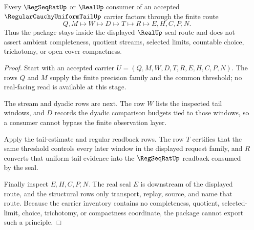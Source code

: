 \begin{theorem}
\label{thm:regular-cauchy-uniform-tail-real-seal-nonescape}
Every $\RegSeqRatUp$ or $\RealUp$ consumer of an accepted $\RegularCauchyUniformTailUp$ carrier factors through the finite route
$$
Q,M \longmapsto W \longmapsto D \longmapsto T \longmapsto R \longmapsto E,H,C,P,N .
$$
Thus the package stays inside the displayed $\RealUp$ seal route and does not assert ambient completeness, quotient streams, selected limits, countable choice, trichotomy, or open-cover compactness.
\end{theorem}
\begin{proof}
Start with an accepted carrier $U=(Q,M,W,D,T,R,E,H,C,P,N)$. The rows $Q$ and $M$ supply the finite precision family and the common threshold; no real-facing read is available at this stage.

The stream and dyadic rows are next. The row $W$ lists the inspected tail windows, and $D$ records the dyadic comparison budgets tied to those windows, so a consumer cannot bypass the finite observation layer.

Apply the tail-estimate and regular readback rows. The row $T$ certifies that the same threshold controls every later window in the displayed request family, and $R$ converts that uniform tail evidence into the $\RegSeqRatUp$ readback consumed by the seal.

Finally inspect $E,H,C,P,N$. The real seal $E$ is downstream of the displayed route, and the structural rows only transport, replay, source, and name that route. Because the carrier inventory contains no completeness, quotient, selected-limit, choice, trichotomy, or compactness coordinate, the package cannot export such a principle.
\end{proof}




